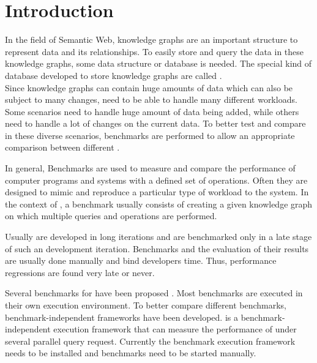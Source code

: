 \chapter{Introduction}
\label{ch:introduction}




In the field of Semantic Web, knowledge graphs are an important structure to represent data and its relationships.
To easily store and query the data in these knowledge graphs, some data structure or database is needed.
The special kind of database developed to store knowledge graphs are called \tsp{}. \\

Since knowledge graphs can contain huge amounts of data which can also be subject to many changes, \tsp{} need to be able to handle many different workloads.
Some scenarios need to handle huge amount of data being added, while others need to handle a lot of changes on the current data.
To better test and compare \tsp{} in these diverse scenarios, benchmarks are performed to allow an appropriate comparison between different \tsp{} \cite{saleemHowRepresentativeSPARQL2019}.

In general, Benchmarks are used to measure and compare the performance of computer programs and systems with a defined set of operations.
Often they are designed to mimic and reproduce a particular type of workload to the system.
In the context of \tsp{}, a benchmark usually consists of creating a given knowledge graph on which multiple queries and operations are performed.

Usually \tsp{} are developed in long iterations and are benchmarked only in a late stage of such an development iteration.
Benchmarks and the evaluation of their results are usually done manually and bind developers time.
Thus, performance regressions are  found very late or never.


Several benchmarks for \tsp{} have been proposed \cite{saleemHowRepresentativeSPARQL2019}.
Most benchmarks are executed in their own execution environment.
To better compare different benchmarks, benchmark-independent frameworks have been developed.
\iguana{} is a benchmark-independent execution framework \cite{conradsIguanaGenericFramework2017} that can measure the performance of \tsp{} under several parallel query request.
Currently the benchmark execution framework needs to be installed and benchmarks need to be started manually.

